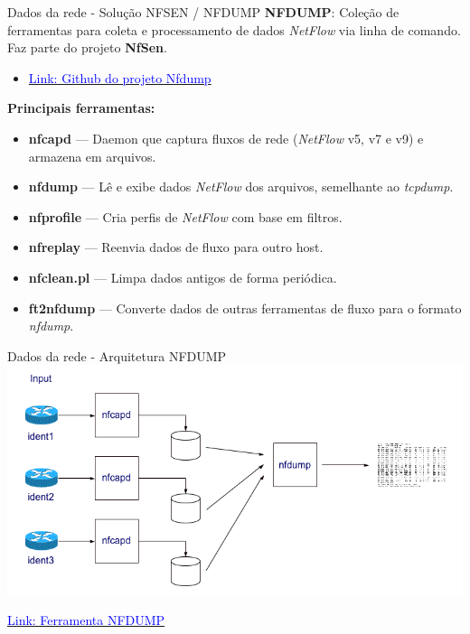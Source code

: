 \begin{frame}{Dados da rede - Solução NFSEN / NFDUMP}
    \textbf{NFDUMP}: Coleção de ferramentas para coleta e processamento de dados \textit{NetFlow} via linha de comando.
    Faz parte do projeto \textbf{NfSen}.

    \begin{itemize}
        \item  \href{https://github.com/phaag/nfdump}{\textcolor{blue}{Link: Github do projeto Nfdump}}
    \end{itemize}



    \vspace{0.3cm}
    \textbf{Principais ferramentas:}
    \begin{itemize}
        \item \textbf{nfcapd} — Daemon que captura fluxos de rede (\textit{NetFlow} v5, v7 e v9) e armazena em arquivos.
        \item \textbf{nfdump} — Lê e exibe dados \textit{NetFlow} dos arquivos, semelhante ao \textit{tcpdump}.
        \item \textbf{nfprofile} — Cria perfis de \textit{NetFlow} com base em filtros.
        \item \textbf{nfreplay} — Reenvia dados de fluxo para outro host.
        \item \textbf{nfclean.pl} — Limpa dados antigos de forma periódica.
        \item \textbf{ft2nfdump} — Converte dados de outras ferramentas de fluxo para o formato \textit{nfdump}.
    \end{itemize}
\end{frame}




\begin{frame}{Dados da rede - Arquitetura NFDUMP}
    \centering
    \includegraphics[width=0.85\linewidth]{Figuras/nfdump.png}
    \vspace{0.3cm}


    \href{https://nfdump.sourceforge.net/}{\textcolor{blue}{Link: Ferramenta NFDUMP}}

\end{frame}


